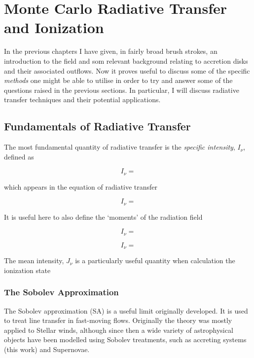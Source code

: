 \chapter{Monte Carlo Radiative Transfer and Ionization}

In the previous chapters I have given, in fairly broad brush strokes,
an introduction to the field and som relevant background relating to accretion 
disks and their associated outflows. Now it proves useful
to discuss some of the specific {\sl methods} one might be able to utilise 
in order to try and answer some of the questions raised in the previous sections.
In particular, I will discuss radiative transfer techniques and 
their potential applications.

\section{Fundamentals of Radiative Transfer}

The most fundamental quantity of radiative transfer is the 
{\em specific intensity}, $I_\nu$, defined as

\begin{equation}
I_\nu = 
\end{equation}

which appears in the equation of radiative transfer

\begin{equation}
I_\nu = 
\end{equation}

It is useful here to also define the `moments' of the radiation field

\begin{equation}
I_\nu = 
\end{equation}

\begin{equation}
I_\nu = 
\end{equation}

The mean intensity, $J_\nu$ is a particularly useful quantity when calculation the ionization
state 


\subsection{The Sobolev Approximation}

The Sobolev approximation (SA) is a useful limit originally developed.
It is used to treat line transfer in fast-moving flows. Originally 
the theory was mostly applied to Stellar winds, although since then
a wide variety of astrophysical objects have been modelled using Sobolev treatments,
such as accreting systems (this work) and Supernovae.

